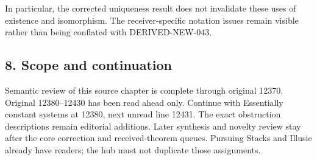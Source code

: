 In particular,\allowbreak{} the corrected uniqueness result does not invalidate these uses of existence and isomorphism. The receiver-specific notation issues remain visible rather than being conflated with DERIVED-NEW-043.

\subsection{8. Scope and continuation}\label{proofs-12008-12370-scope-and-continuation}

Semantic review of this source chapter is complete through original 12370. Original 12380–\allowbreak{}12430 has been read ahead only. Continue with Essentially constant systems at 12380,\allowbreak{} next unread line 12431. The exact obstruction descriptions remain editorial additions. Later synthesis and novelty review stay after the core correction and received-theorem queues. Pursuing Stacks and Illusie already have readers; the hub must not duplicate those assignments.
